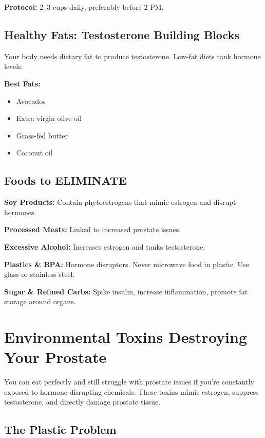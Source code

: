 \documentclass[11pt,oneside,openany]{book}
\begin{document}
\textbf{Protocol:} 2--3 cups daily, preferably before 2 PM.

\section*{Healthy Fats: Testosterone Building Blocks}
Your body needs dietary fat to produce testosterone. Low-fat diets tank hormone levels.

\textbf{Best Fats:}
\begin{itemize}[leftmargin=*]
\item Avocados
\item Extra virgin olive oil
\item Grass-fed butter
\item Coconut oil
\end{itemize}

\section*{Foods to ELIMINATE}

\textbf{Soy Products:} Contain phytoestrogens that mimic estrogen and disrupt hormones.

\textbf{Processed Meats:} Linked to increased prostate issues.

\textbf{Excessive Alcohol:} Increases estrogen and tanks testosterone.

\textbf{Plastics \& BPA:} Hormone disruptors. Never microwave food in plastic. Use glass or stainless steel.

\textbf{Sugar \& Refined Carbs:} Spike insulin, increase inflammation, promote fat storage around organs.


\chapter*{Environmental Toxins Destroying Your Prostate}

You can eat perfectly and still struggle with prostate issues if you're constantly exposed to hormone-disrupting chemicals. These toxins mimic estrogen, suppress testosterone, and directly damage prostate tissue.

\section*{The Plastic Problem}
\end{document}
